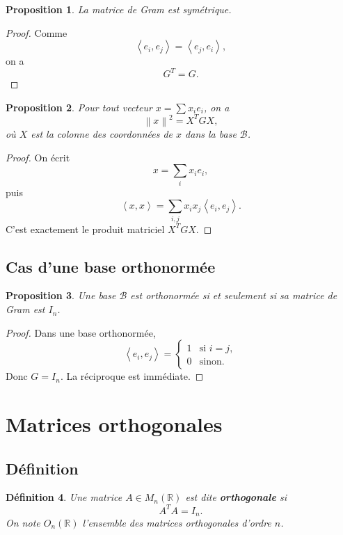 \documentclass[11pt,a4paper]{article}
\newtheorem{definition}{Définition}[section]
\newtheorem{proposition}[definition]{Proposition}
\theoremstyle{remark}
\newcommand{\R}{\mathbb{R}}
\newcommand{\Norm}[1]{\left\|#1\right\|}
\newcommand{\scal}[2]{\left\langle #1,#2\right\rangle}
\begin{document}
\begin{proposition}
La matrice de Gram est symétrique.
\end{proposition}

\begin{proof}
Comme
\[
\scal{e_i}{e_j}=\scal{e_j}{e_i},
\]
on a
\[
G^T=G.
\]
\end{proof}

\begin{proposition}
Pour tout vecteur \(x=\sum x_ie_i\), on a
\[
\Norm{x}^2=X^T G X,
\]
où \(X\) est la colonne des coordonnées de \(x\) dans la base \(\mathcal B\).
\end{proposition}

\begin{proof}
On écrit
\[
x=\sum_i x_ie_i,
\]
puis
\[
\scal{x}{x}=\sum_{i,j}x_ix_j\scal{e_i}{e_j}.
\]
C’est exactement le produit matriciel \(X^TGX\).
\end{proof}

\subsection{Cas d’une base orthonormée}

\begin{proposition}
Une base \(\mathcal B\) est orthonormée si et seulement si sa matrice de Gram est \(I_n\).
\end{proposition}

\begin{proof}
Dans une base orthonormée,
\[
\scal{e_i}{e_j}=
\begin{cases}
1 & \text{si } i=j,\\
0 & \text{sinon}.
\end{cases}
\]
Donc \(G=I_n\). La réciproque est immédiate.
\end{proof}

\section{Matrices orthogonales}

\subsection{Définition}

\begin{definition}
Une matrice \(A\in M_n(\R)\) est dite \textbf{orthogonale} si
\[
A^TA=I_n.
\]
On note \(O_n(\R)\) l’ensemble des matrices orthogonales d’ordre \(n\).
\end{definition}
\end{document}
